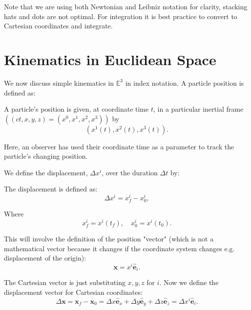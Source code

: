 \documentclass[10pt]{article}
\begin{document}
	Note that we are using both Newtonian and Leibniz notation for clarity, stacking hats and dots are not optimal. For integration it is best practice to convert to Cartesian coordinates and integrate.

	\section{Kinematics in Euclidean Space}
	We now discuss simple kinematics in $\mathbb{E}^{3}$ in index notation. A particle position is defined as:
	\begin{definition}
		A particle's position is given, at coordinate time $t$, in a particular inertial frame $\left( (ct,x,y,z) = (x^{0},x^{1},x^{2},x^{3}) \right) $ by
		\begin{equation}
		  \left(x^{1}(t),x^{2}(t),x^{3}(t)\right).
		\end{equation}

		Here, an observer has used their coordinate time as a parameter to track the particle's changing position.
	\end{definition}

	We define the displacement, $\Delta x^{i}$, over the duration $\Delta t$ by:
	\begin{definition}
		The displacement is defined as:
		\begin{equation}
		  \Delta x ^{i} = x_{f}^{i} - x_{0}^{i},
		\end{equation}

		Where
		\begin{equation}
		  x_{f}^{i} = x^{i}(t_{f}), \quad x_{0}^{i} = x^{i}(t_{0}).
		\end{equation}
	\end{definition}

	This will involve the definition of the position "vector" (which is not a mathematical vector because it changes if the coordinate system changes e.g. displacement of the origin):
	\begin{equation}
	  \mathbf{x} = x^{i}\hat{\mathbf{e}}_i.
	\end{equation}

	The Cartesian vector is just substituting $x,y,z$ for $i$. Now we define the displacement vector for Cartesian coordinates:
	\begin{equation}
	  \Delta \mathbf{x} = \mathbf{x}_{f} - \mathbf{x}_{0} = \Delta x \hat{\mathbf{e}}_x + \Delta y \hat{\mathbf{e}}_y + \Delta z \hat{\mathbf{e}}_z = \Delta x^{i}\hat{\mathbf{e}}_i. 
	\end{equation}
\end{document}

